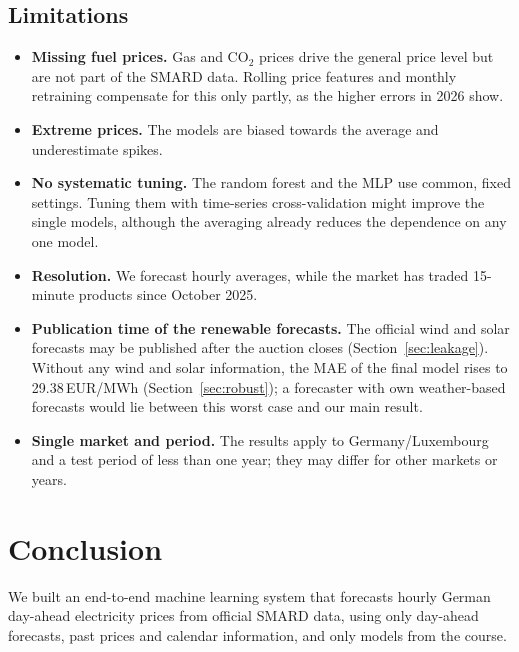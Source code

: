 \documentclass[12pt,oneside]{article}
\begin{document}
\subsection{Limitations} \label{sec:limitations}

\begin{itemize}
    \item \textbf{Missing fuel prices.} Gas and CO$_2$ prices drive the general price level but are not part of the SMARD data. Rolling price features and monthly retraining compensate for this only partly, as the higher errors in 2026 show.
    \item \textbf{Extreme prices.} The models are biased towards the average and underestimate spikes.
    \item \textbf{No systematic tuning.} The random forest and the MLP use common, fixed settings. Tuning them with time-series cross-validation might improve the single models, although the averaging already reduces the dependence on any one model.
    \item \textbf{Resolution.} We forecast hourly averages, while the market has traded 15-minute products since October 2025.
    \item \textbf{Publication time of the renewable forecasts.} The official wind and solar forecasts may be published after the auction closes (Section~\ref{sec:leakage}). Without any wind and solar information, the MAE of the final model rises to 29.38\,EUR/MWh (Section~\ref{sec:robust}); a forecaster with own weather-based forecasts would lie between this worst case and our main result.
    \item \textbf{Single market and period.} The results apply to Germany/Luxembourg and a test period of less than one year; they may differ for other markets or years.
\end{itemize}

\section{Conclusion} \label{sec:conclusion}

We built an end-to-end machine learning system that forecasts hourly German day-ahead electricity prices from official SMARD data, using only day-ahead forecasts, past prices and calendar information, and only models from the course.
\end{document}

